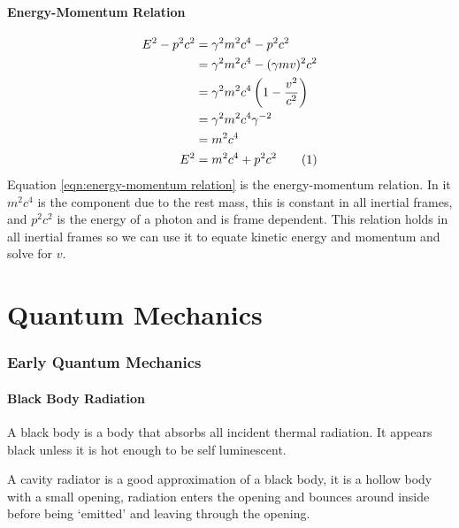 \documentclass{article}
\begin{document}
    \subsection{Energy-Momentum Relation}
    \begin{align*}
        E^2 - p^2c^2 &= \gamma^2m^2c^4 - p^2c^2\\
        &= \gamma^2m^2c^4 - (\gamma mv)^2c^2\\
        &= \gamma^2 m^2c^4\left(1 - \frac{v^2}{c^2}\right)\\
        &= \gamma^2m^2c^4\gamma^{-2}\\
        &= m^2c^4\\
        E^2 &= m^2c^4 + p^2c^2\stepcounter{equation}\tag{\theequation}\label{eqn:energy-momentum relation}
    \end{align*}
    Equation \ref{eqn:energy-momentum relation} is the energy-momentum relation. 
    In it \(m^2c^4\) is the component due to the rest mass, this is constant in all inertial frames, and \(p^2c^2\) is the energy of a photon and is frame dependent.
    This relation holds in all inertial frames so we can use it to equate kinetic energy and momentum and solve for \(v\).
    
    \part{Quantum Mechanics}
    \section{Early Quantum Mechanics}
    \subsection{Black Body Radiation}
    A black body is a body that absorbs all incident thermal radiation.
    It appears black unless it is hot enough to be self luminescent.
    
    A cavity radiator is a good approximation of a black body, it is a hollow body with a small opening, radiation enters the opening and bounces around inside before being `emitted' and leaving through the opening.
\end{document}
